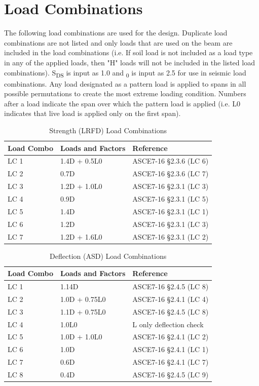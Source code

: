 \documentclass[12pt, fleqn]{article}
\begin{document}
\section{Load Combinations}
The following load combinations are used for the design. Duplicate load combinations are not listed and only loads that are used on the beam are included in the load combinations (i.e. If soil load is not included as a load type in any of the applied loads, then "H" loads will not be included in the listed load combinations). S\textsubscript{DS} is input as 1.0 and \textOmega\textsubscript{0} is input as 2.5 for use in seismic load combinations. Any load designated as a pattern load is applied to spans in all possible permutations to create the most extreme loading condition. Numbers after a load indicate the span over which the pattern load is applied (i.e. L0 indicates that live load is applied only on the first span).
\begin{table}[H]
\caption{Strength (LRFD) Load Combinations}
\centering
\begin{tabular}{l l l}
\hline
Load Combo & Loads and Factors & Reference\\
\hline
LC 1 & 1.4D + 0.5L0 & ASCE7-16 \S2.3.6 (LC 6)\\
LC 2 & 0.7D & ASCE7-16 \S2.3.6 (LC 7)\\
LC 3 & 1.2D + 1.0L0 & ASCE7-16 \S2.3.1 (LC 3)\\
LC 4 & 0.9D & ASCE7-16 \S2.3.1 (LC 5)\\
LC 5 & 1.4D & ASCE7-16 \S2.3.1 (LC 1)\\
LC 6 & 1.2D & ASCE7-16 \S2.3.1 (LC 3)\\
LC 7 & 1.2D + 1.6L0 & ASCE7-16 \S2.3.1 (LC 2)\\
\hline
\end{tabular}
\end{table}
\begin{table}[H]
\caption{Deflection (ASD) Load Combinations}
\centering
\begin{tabular}{l l l}
\hline
Load Combo & Loads and Factors & Reference\\
\hline
LC 1 & 1.14D & ASCE7-16 \S2.4.5 (LC 8)\\
LC 2 & 1.0D + 0.75L0 & ASCE7-16 \S2.4.1 (LC 4)\\
LC 3 & 1.1D + 0.75L0 & ASCE7-16 \S2.4.5 (LC 8)\\
LC 4 & 1.0L0 & L only deflection check\\
LC 5 & 1.0D + 1.0L0 & ASCE7-16 \S2.4.1 (LC 2)\\
LC 6 & 1.0D & ASCE7-16 \S2.4.1 (LC 1)\\
LC 7 & 0.6D & ASCE7-16 \S2.4.1 (LC 7)\\
LC 8 & 0.4D & ASCE7-16 \S2.4.5 (LC 9)\\
\hline
\end{tabular}
\end{table}
\end{document}
